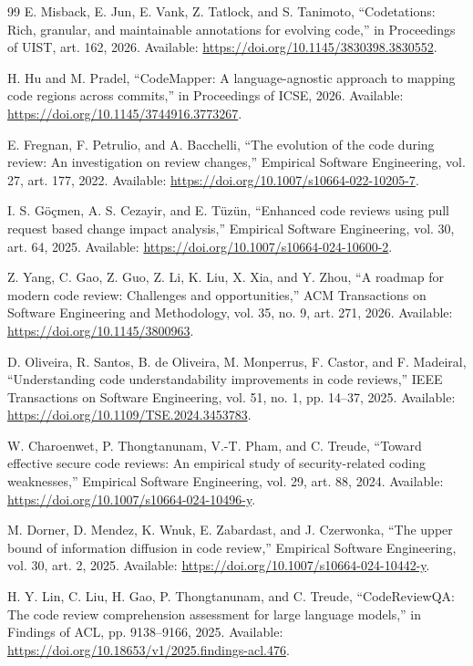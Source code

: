 \documentclass[10pt,conference,letterpaper]{IEEEtran}
\begin{document}
\begin{thebibliography}{99}
 E. Misback, E. Jun, E. Vank, Z. Tatlock, and S. Tanimoto, “Codetations: Rich, granular, and maintainable annotations for evolving code,” in Proceedings of UIST, art. 162, 2026. Available: \url{https://doi.org/10.1145/3830398.3830552}.

 H. Hu and M. Pradel, “CodeMapper: A language-agnostic approach to mapping code regions across commits,” in Proceedings of ICSE, 2026. Available: \url{https://doi.org/10.1145/3744916.3773267}.

 E. Fregnan, F. Petrulio, and A. Bacchelli, “The evolution of the code during review: An investigation on review changes,” Empirical Software Engineering, vol. 27, art. 177, 2022. Available: \url{https://doi.org/10.1007/s10664-022-10205-7}.

 I. S. Göçmen, A. S. Cezayir, and E. Tüzün, “Enhanced code reviews using pull request based change impact analysis,” Empirical Software Engineering, vol. 30, art. 64, 2025. Available: \url{https://doi.org/10.1007/s10664-024-10600-2}.

 Z. Yang, C. Gao, Z. Guo, Z. Li, K. Liu, X. Xia, and Y. Zhou, “A roadmap for modern code review: Challenges and opportunities,” ACM Transactions on Software Engineering and Methodology, vol. 35, no. 9, art. 271, 2026. Available: \url{https://doi.org/10.1145/3800963}.

 D. Oliveira, R. Santos, B. de Oliveira, M. Monperrus, F. Castor, and F. Madeiral, “Understanding code understandability improvements in code reviews,” IEEE Transactions on Software Engineering, vol. 51, no. 1, pp. 14–37, 2025. Available: \url{https://doi.org/10.1109/TSE.2024.3453783}.

 W. Charoenwet, P. Thongtanunam, V.-T. Pham, and C. Treude, “Toward effective secure code reviews: An empirical study of security-related coding weaknesses,” Empirical Software Engineering, vol. 29, art. 88, 2024. Available: \url{https://doi.org/10.1007/s10664-024-10496-y}.

 M. Dorner, D. Mendez, K. Wnuk, E. Zabardast, and J. Czerwonka, “The upper bound of information diffusion in code review,” Empirical Software Engineering, vol. 30, art. 2, 2025. Available: \url{https://doi.org/10.1007/s10664-024-10442-y}.

 H. Y. Lin, C. Liu, H. Gao, P. Thongtanunam, and C. Treude, “CodeReviewQA: The code review comprehension assessment for large language models,” in Findings of ACL, pp. 9138–9166, 2025. Available: \url{https://doi.org/10.18653/v1/2025.findings-acl.476}.


\end{thebibliography}
\end{document}
